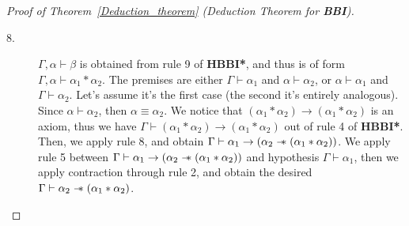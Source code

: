 \documentclass[a4paper]{article}
\newcommand\magicwand{\mathrel{-\mkern-6mu*}}
\newcommand{\BBI}{\textbf{BBI}\xspace}
\begin{document}
\begin{proof}[Proof of Theorem~\ref{Deduction_theorem} (Deduction Theorem for \BBI)]
\begin{description}
        \item[8.] $\Gamma, \alpha\vdash \beta$ is obtained from rule 9 of \textbf{HBBI*}, and thus is of form $ \Gamma, \alpha \vdash \alpha_1 * \alpha_2$. The premises are either $\Gamma\vdash \alpha_1$ and $\alpha \vdash \alpha_2$, or $\alpha \vdash \alpha_1$ and $\Gamma \vdash \alpha_2$. Let's assume it's the first case (the second it's entirely analogous). Since $\alpha \vdash \alpha_2$, then $\alpha \equiv \alpha_2$. We notice that $(\alpha_1 * \alpha_2) \rightarrow (\alpha_1 * \alpha_2)$ is an axiom, thus we have $\Gamma \vdash (\alpha_1 * \alpha_2) \rightarrow (\alpha_1 * \alpha_2)$ out of rule 4 of \textbf{HBBI*}. Then, we apply rule 8, and obtain $\Gamma \vdash \alpha_1 \rightarrow (\alpha_2 \magicwand (\alpha_1 * \alpha_2))$. We apply rule 5 between $\Gamma \vdash \alpha_1 \rightarrow (\alpha_2 \magicwand (\alpha_1 * \alpha_2))$ and hypothesis $\Gamma \vdash \alpha_1$, then we apply contraction through rule 2, and obtain the desired $\Gamma \vdash \alpha_2 \magicwand (\alpha_1 * \alpha_2)$.


    \end{description}

\end{proof}
\end{document}
